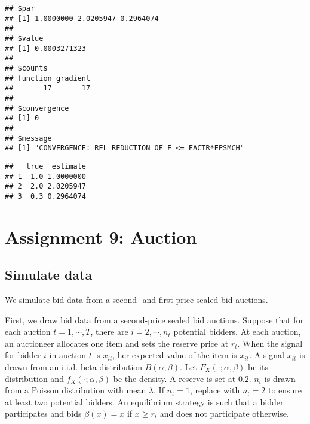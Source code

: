 \documentclass[
]{book}
\newenvironment{Shaded}{\begin{snugshade}}{\end{snugshade}}
\newcommand{\AttributeTok}[1]{\textcolor[rgb]{0.13,0.29,0.53}{#1}}
\newcommand{\FunctionTok}[1]{\textcolor[rgb]{0.13,0.29,0.53}{\textbf{#1}}}
\newcommand{\NormalTok}[1]{#1}
\newcommand{\OtherTok}[1]{\textcolor[rgb]{0.56,0.35,0.01}{#1}}
\newcommand{\SpecialCharTok}[1]{\textcolor[rgb]{0.81,0.36,0.00}{\textbf{#1}}}
\begin{document}
\begin{verbatim}
## $par
## [1] 1.0000000 2.0205947 0.2964074
## 
## $value
## [1] 0.0003271323
## 
## $counts
## function gradient 
##       17       17 
## 
## $convergence
## [1] 0
## 
## $message
## [1] "CONVERGENCE: REL_REDUCTION_OF_F <= FACTR*EPSMCH"
\end{verbatim}

\begin{Shaded}
\end{Shaded}

\begin{verbatim}
##   true  estimate
## 1  1.0 1.0000000
## 2  2.0 2.0205947
## 3  0.3 0.2964074
\end{verbatim}

\hypertarget{assignment9}{%
\chapter{Assignment 9: Auction}\label{assignment9}}

\hypertarget{simulate-data-8}{%
\section{Simulate data}\label{simulate-data-8}}

We simulate bid data from a second- and first-price sealed bid auctions.

First, we draw bid data from a second-price sealed bid auctions. Suppose that for each auction \(t = 1, \cdots, T\), there are \(i = 2, \cdots, n_t\) potential bidders. At each auction, an auctioneer allocates one item and sets the reserve price at \(r_t\). When the signal for bidder \(i\) in auction \(t\) is \(x_{it}\), her expected value of the item is \(x_{it}\). A signal \(x_{it}\) is drawn from an i.i.d. beta distribution \(B(\alpha, \beta)\). Let \(F_X(\cdot; \alpha, \beta)\) be its distribution and \(f_X(\cdot; \alpha, \beta)\) be the density. A reserve is set at 0.2. \(n_t\) is drawn from a Poisson distribution with mean \(\lambda\). If \(n_t = 1\), replace with \(n_t = 2\) to ensure at least two potential bidders. An equilibrium strategy is such that a bidder participates and bids \(\beta(x) = x\) if \(x \ge r_t\) and does not participate otherwise.
\end{document}
